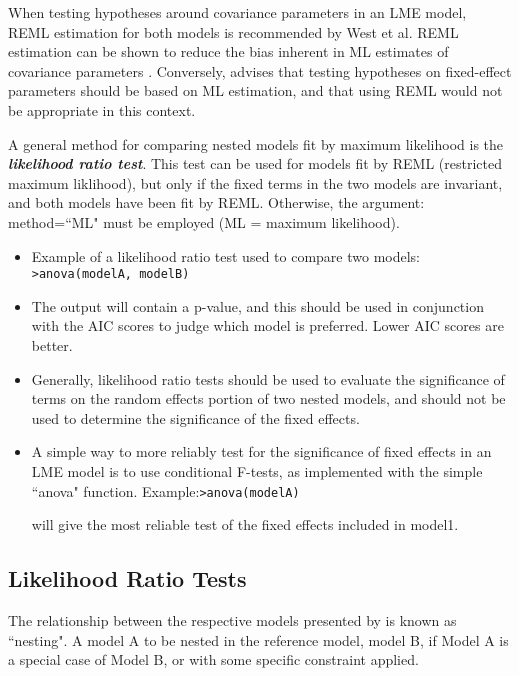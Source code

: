 \documentclass[12pt, a4paper]{report}
\theoremstyle{plain}
\theoremstyle{definition}
\theoremstyle{remark}
\begin{document}
When testing hypotheses around covariance parameters in an LME model, REML estimation for both models is recommended by West et al. REML estimation can be shown to reduce the bias inherent in ML estimates of covariance parameters \citep{west}. Conversely, \citet{pb} advises that testing hypotheses on fixed-effect parameters should be based on ML estimation, and that using REML would not be appropriate in this context.







A general method for comparing nested models fit by maximum likelihood is the \textbf{\emph{likelihood ratio test}}. This test can be used for models fit by REML (restricted maximum liklihood), but only if the fixed terms in the two models are invariant, and both models have been fit by REML. Otherwise, the argument: method=``ML" must be employed (ML = maximum likelihood).

\begin{itemize}
	\item Example of a likelihood ratio test used to compare two models: \newline \texttt{>anova(modelA, modelB)}
	
	\item The output will contain a p-value, and this should be used in conjunction with the AIC scores to judge which model is preferred. Lower AIC scores are better.
	
	\item Generally, likelihood ratio tests should be used to evaluate the significance of terms on the
	random effects portion of two nested models, and should not be used to determine the significance of the fixed effects.
	\item A simple way to more reliably test for the significance of fixed effects in an LME model is to use
	conditional F-tests, as implemented with the simple ``anova" function.
	Example:\newline \texttt{>anova(modelA)}
	
	
	will give the most reliable test of the fixed effects included in model1.
\end{itemize}


\subsection{Likelihood Ratio Tests}
The relationship between the respective models presented by \citet{ARoy2009} is known as ``nesting".
A model A to be nested in the reference model, model B, if Model A is a special case
of Model B, or with some specific constraint applied.
\end{document}
